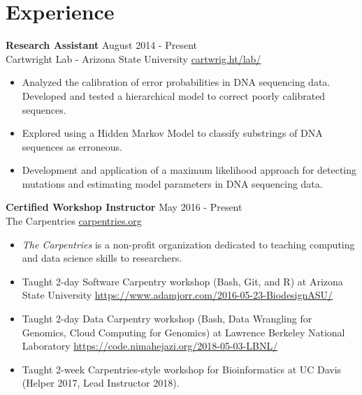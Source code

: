 \documentclass[12pt]{article}
\begin{document}
\section*{ Experience}

\noindent \textbf{Research Assistant} \hfill{} August 2014 - Present\\
Cartwright Lab - Arizona State University \hfill{}  \url{cartwrig.ht/lab/}
\begin{itemize}[nosep]
\item Analyzed the calibration of error probabilities in DNA sequencing data. Developed and tested a hierarchical model to correct poorly calibrated sequences.
\item Explored using a Hidden Markov Model to classify substrings of DNA sequences as erroneous.
\item Development and application of a maximum likelihood approach for detecting mutations and estimating model parameters in DNA sequencing data. 
\end{itemize}

\noindent \textbf{Certified Workshop Instructor} \hfill{} May 2016 - Present\\
The Carpentries \hfill{}  \url{carpentries.org}
\begin{itemize}[nosep]
\item \textit{The Carpentries} is a non-profit organization dedicated to teaching computing and data science skills to researchers.
\item Taught 2-day Software Carpentry workshop (Bash, Git, and R) at Arizona State University  \url{https://www.adamjorr.com/2016-05-23-BiodesignASU/}
\item Taught 2-day Data Carpentry workshop (Bash, Data Wrangling for Genomics, Cloud Computing for Genomics) at Lawrence Berkeley National Laboratory  \url{https://code.nimahejazi.org/2018-05-03-LBNL/}
\item Taught 2-week Carpentries-style workshop for Bioinformatics at UC Davis (Helper 2017, Lead Instructor 2018).
\end{itemize}

\end{document}
